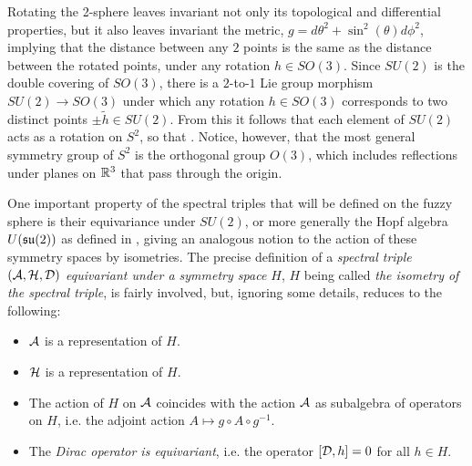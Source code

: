 
Rotating the 2-sphere leaves invariant not only its topological and differential properties, but it also leaves invariant the metric, $g = d\theta^2 + \sin^2(\theta) d\phi^2$, implying that the distance between any $2$ points is the same as the distance between the rotated points, under any rotation $h \in SO(3)$. Since $SU(2)$ is the double covering of $SO(3)$, there is a $2$-to-$1$ Lie group morphism $SU(2) \to SO(3)$ under which any rotation $h \in SO(3)$ corresponds to two distinct points $\pm \tilde h \in SU(2)$. From this it follows that each element of $SU(2)$ acts as a rotation on $S^2$, so that . Notice, however, that the most general symmetry group of $S^2$ is the orthogonal group $O(3)$, which includes reflections under planes on $\mathbb{R}^3$ that pass through the origin.

One important property of the spectral triples that will be defined on the fuzzy sphere is their equivariance under $SU(2)$, or more generally the Hopf algebra $U(\mathfrak{su}(2))$ as defined in \cite{Sitarz}, giving an analogous notion to the action of these symmetry spaces by isometries. The precise definition of a \textit{spectral triple $(\mathcal A, \mathcal H, \mathcal D)$ equivariant under a symmetry space $H$}, $H$ being called \textit{the isometry of the spectral triple}, is fairly involved, but, ignoring some details, reduces to the following:
    \begin{itemize}
    
    \item $\mathcal A$ is a representation of $H$.
    
    \item $\mathcal H $ is a representation of $H$.
    
    \item The action of $H$ on $\mathcal A$ coincides with the action $\mathcal A$ as subalgebra of operators on $H$, i.e. the adjoint action $A \mapsto g \circ A \circ g^{-1}$. %
    
    \item The \textit{Dirac operator is equivariant}, i.e. the operator $[\mathcal D, h] = 0$ for all $h \in H$.
    
    \end{itemize}

